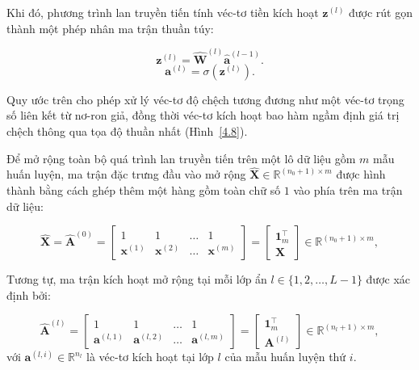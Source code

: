 Khi đó, phương trình lan truyền tiến tính véc-tơ tiền kích hoạt $\mathbf{z}^{(l)}$ được rút gọn thành một phép nhân ma trận thuần túy:

\begin{equation}
    \mathbf{z}^{(l)} = \hat{\mathbf{W}}^{(l)} \hat{\mathbf{a}}^{(l-1)}.
\end{equation}
\begin{equation}
\mathbf{a}^{(l)} = \sigma(\mathbf{z}^{(l)}).
\end{equation}

Quy ước trên cho phép xử lý véc-tơ độ chệch tương đương như một véc-tơ trọng số liên kết từ nơ-ron giả, đồng thời véc-tơ kích hoạt bao hàm ngầm định giá trị chệch thông qua tọa độ thuần nhất (Hình~\ref{4.8}). 

Để mở rộng toàn bộ quá trình lan truyền tiến trên một lô dữ liệu gồm $m$ mẫu huấn luyện, ma trận đặc trưng đầu vào mở rộng $\hat{\mathbf{X}} \in \mathbb{R}^{(n_0 + 1) \times m}$ được hình thành bằng cách ghép thêm một hàng gồm toàn chữ số $1$ vào phía trên ma trận dữ liệu:

\begin{equation}
    \hat{\mathbf{X}} = \hat{\mathbf{A}}^{(0)} = \begin{bmatrix}
        1 & 1 & \dots & 1 \\
        \mathbf{x}^{(1)} & \mathbf{x}^{(2)} & \dots & \mathbf{x}^{(m)}
    \end{bmatrix} = \begin{bmatrix} \mathbf{1}_m^\top \\ \mathbf{X} \end{bmatrix} \in \mathbb{R}^{(n_0 + 1) \times m},
\end{equation}

Tương tự, ma trận kích hoạt mở rộng tại mỗi lớp ẩn $l \in \{1, 2, \dots, L-1\}$ được xác định bởi:

\begin{equation}
    \hat{\mathbf{A}}^{(l)} = \begin{bmatrix}
        1 & 1 & \dots & 1 \\
        \mathbf{a}^{(l, 1)} & \mathbf{a}^{(l, 2)} & \dots & \mathbf{a}^{(l, m)}
    \end{bmatrix} = \begin{bmatrix} \mathbf{1}_m^\top \\ \mathbf{A}^{(l)} \end{bmatrix} \in \mathbb{R}^{(n_l + 1) \times m},
\end{equation}
với $\mathbf{a}^{(l, i)} \in \mathbb{R}^{n_l}$ là véc-tơ kích hoạt tại lớp $l$ của mẫu huấn luyện thứ $i$.

